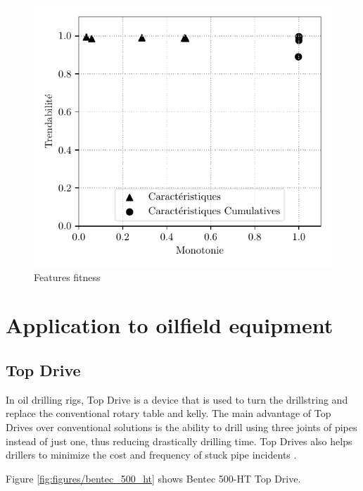 \begin{figure}[H]
	\centering
	\includegraphics{figures/featuresfitness_fr.pdf}
	\caption{Features fitness}%
	\label{fig:features_fitness}
\end{figure}

\section{Application to oilfield equipment}%
\label{sec:application_to_oilfield_equipment}

\subsection{Top Drive}%
\label{sub:top_drive}

In oil drilling rigs, Top Drive is a device that is used to turn the drillstring and replace the conventional rotary table and kelly. The main advantage of Top Drives over conventional solutions is the ability to drill using three joints of pipes instead of just one, thus reducing drastically drilling time. Top Drives also helps drillers to minimize the cost and frequency of stuck pipe incidents \cite{slbtopdrive}.

Figure \ref{fig:figures/bentec_500_ht} shows Bentec 500-HT Top Drive.

